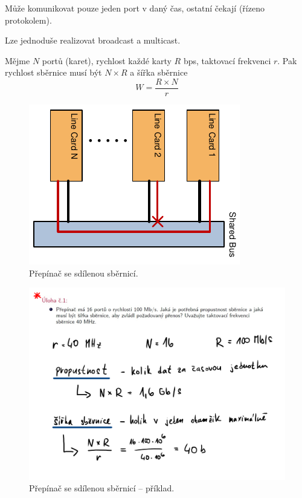 \begin{compactitem}
    \item Může komunikovat pouze jeden port v daný čas, ostatní čekají (řízeno protokolem).
    \item Lze jednoduše realizovat broadcast a multicast.
    \item Mějme $N$ portů (karet), rychlost každé karty $R$ bps, taktovací frekvenci $r$. Pak rychlost sběrnice musí být $N \times R$ a šířka sběrnice $$W = \frac{R \times N}{r}$$
\end{compactitem}

\begin{figure}[H]
    \centering
    \includegraphics[width=0.5\linewidth]{sdilena_sbernice.pdf}
    \caption{Přepínač se sdílenou sběrnicí.}
\end{figure}

\begin{figure}[H]
    \centering
    \includegraphics[width=1\linewidth]{sdilena_sbernice_priklad.pdf}
    \caption{Přepínač se sdílenou sběrnicí -- příklad.}
\end{figure}

